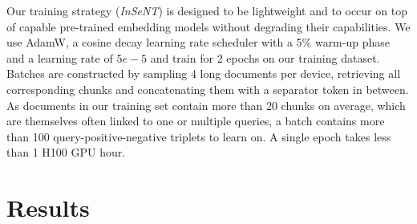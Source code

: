 Our training strategy (\emph{InSeNT}) is designed to be lightweight and to occur on top of capable pre-trained embedding models without degrading their capabilities. 
We use AdamW, a cosine decay learning rate scheduler with a 5\% warm-up phase and a learning rate of $5e-5$ and train for 2 epochs on our training dataset.
Batches are constructed by sampling 4 long documents per device, retrieving all corresponding chunks and concatenating them with a separator token in between. As documents in our training set contain more than 20 chunks on average, which are themselves often linked to one or multiple queries, a batch contains more than 100 query-positive-negative triplets to learn on. A single epoch takes less than 1 H100 GPU hour.



\section{Results}
\label{section:conteb:results}




